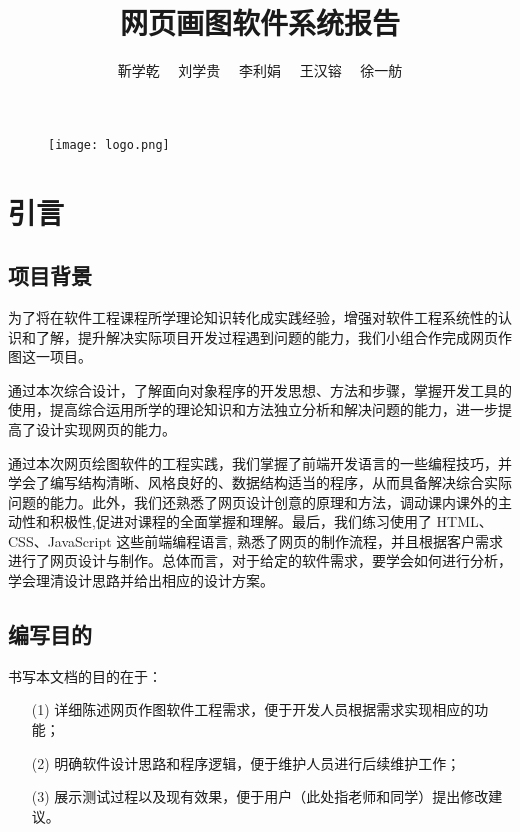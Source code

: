 \documentclass[lang=cn]{elegantpaper}
\title{网页画图软件系统报告}
\author{靳学乾 　刘学贵 　李利娟 　王汉镕 　徐一舫}
\begin{document}
\begin{figure}
  \begin{minipage}{0.6\linewidth}
    \texttt{[image: logo.png]}
  \end{minipage}
\end{figure}

\maketitle

\section{引言}

\subsection{项目背景}
为了将在软件工程课程所学理论知识转化成实践经验，增强对软件工程系统性的认识和了解，提升解决实际项目开发过程遇到问题的能力，我们小组合作完成网页作图这一项目。

通过本次综合设计，了解面向对象程序的开发思想、方法和步骤，掌握开发工具的使用，提高综合运用所学的理论知识和方法独立分析和解决问题的能力，进一步提高了设计实现网页的能力。

通过本次网页绘图软件的工程实践，我们掌握了前端开发语言的一些编程技巧，并学会了编写结构清晰、风格良好的、数据结构适当的程序，从而具备解决综合实际问题的能力。此外，我们还熟悉了网页设计创意的原理和方法，调动课内课外的主动性和积极性,促进对课程的全面掌握和理解。最后，我们练习使用了 HTML、CSS、JavaScript 这些前端编程语言, 熟悉了网页的制作流程，并且根据客户需求进行了网页设计与制作。总体而言，对于给定的软件需求，要学会如何进行分析，学会理清设计思路并给出相应的设计方案。

\subsection{编写目的}
书写本文档的目的在于：
\begin{itemize}
	\item [(1)]详细陈述网页作图软件工程需求，便于开发人员根据需求实现相应的功能；
	\item [(2)]明确软件设计思路和程序逻辑，便于维护人员进行后续维护工作；
	\item [(3)]展示测试过程以及现有效果，便于用户（此处指老师和同学）提出修改建议。
\end{itemize}
\end{document}
